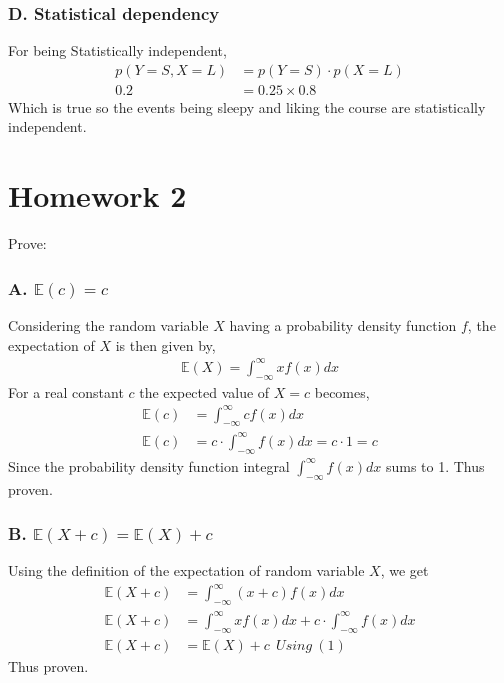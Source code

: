 \documentclass{article}
\begin{document}
\subsubsection*{D. Statistical dependency}
For being Statistically independent,
\begin{align*}
    p(Y=S,X=L) &= p(Y=S) \cdot p(X=L)\\
    0.2 &= 0.25 \times 0.8
\end{align*}
Which is true so the events being sleepy and liking the course are statistically independent.

\section*{Homework 2}

Prove:

\subsubsection*{A. $\mathbb{E}(c)=c$}

Considering the random variable $X$ having a probability density function $f$, 
the expectation of $X$ is then given by,
\begin{align}
    \mathbb{E}(X) = \int_{-\infty}^{\infty} x f(x) dx
\end{align}
For a real constant $c$ the expected value of $X=c$ becomes,
\begin{align*}
    \mathbb{E}(c) &= \int_{-\infty}^{\infty} c f(x) dx\\
    \mathbb{E}(c) &= c \cdot \int_{-\infty}^{\infty} f(x) dx = c \cdot 1 = c
\end{align*}
Since the probability density function integral $\int_{-\infty}^{\infty} f(x) dx$ sums to 1. Thus proven.

\subsubsection*{B. $\mathbb{E}(X+c)=\mathbb{E}(X) + c$}
Using the definition of the expectation of random variable $X$, we get
\begin{align*}
    \mathbb{E}(X+c) &= \int_{-\infty}^{\infty} (x+c) f(x) dx\\
    \mathbb{E}(X+c) &= \int_{-\infty}^{\infty} x f(x) dx + c \cdot \int_{-\infty}^{\infty} f(x) dx\\
    \mathbb{E}(X+c) &= \mathbb{E}(X) + c \ \ Using\ (1)
\end{align*}
Thus proven.
\end{document}
